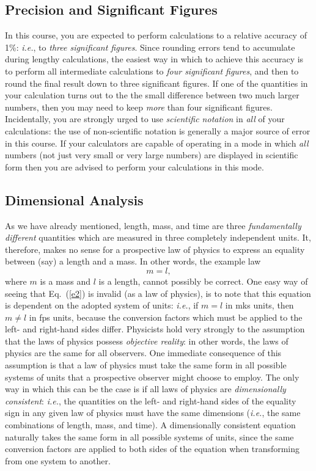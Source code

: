\subsection{Precision and Significant Figures}
In this course, you are expected to perform calculations to a relative accuracy
of 1\%: {\em i.e.}, to {\em three significant figures}. Since rounding errors tend
to accumulate during lengthy calculations, the easiest way in which to
achieve this accuracy is to perform all intermediate calculations to
{\em four significant figures}, and then to round the final result down to three significant figures.
If one of the quantities in your calculation turns out to the the small difference between
two much larger numbers, then you may need to keep {\em  more} than four significant figures.
Incidentally, you are strongly urged to use {\em scientific notation} in {\em all} of your
calculations: the use of non-scientific notation is generally a major source of error
in this course.
If your calculators are capable of operating in a mode in which {\em all} numbers 
(not just very small or very large numbers)  are
displayed in scientific form  then you are 
advised to
 perform your  calculations in this mode. 

\subsection{Dimensional Analysis}
As we have already mentioned, length, mass, and time are three {\em fundamentally different} quantities
which are measured in three completely independent units. It, therefore, makes no sense for a
prospective law of physics to express an equality between (say) a length and a mass. In other
words, the example law
\begin{equation}\label{e2}
m = l,
\end{equation}
where $m$ is a mass and $l$ is a length, cannot possibly be correct. One easy way of
seeing that Eq.~(\ref{e2}) is invalid (as a law of physics), is to note that this equation
is dependent on the adopted system of units: {\em i.e.}, if $m=l$ in mks units, then
$m\neq l$ in fps units, because the conversion factors which must be
applied to the left- and right-hand
sides differ. Physicists hold very strongly to the assumption that the laws of physics
possess {\em objective reality}: in other words,  the laws of physics are the same for
all  observers. One immediate consequence of  this assumption is that a law
of physics must take the same form in all possible systems of units that a prospective
observer might choose to employ. The only way in which this can be the case is if
all laws of physics are {\em dimensionally consistent}: {\em i.e.}, the quantities
on the left- and right-hand sides of the equality sign in any given law of
physics must have the same dimensions ({\em i.e.},
the same combinations of length, mass, and time). A dimensionally consistent equation
naturally takes the same form in all possible systems of units, since the same conversion
factors are applied to both sides of the equation when transforming from one system  to another.

